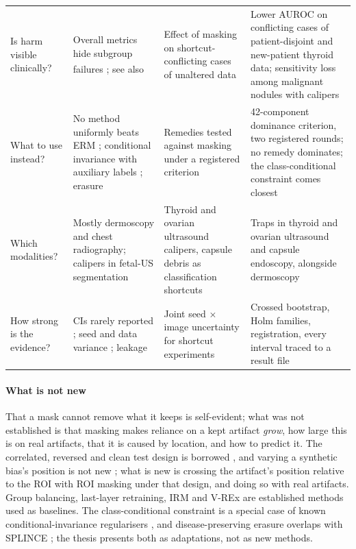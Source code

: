 \documentclass[11pt,a4paper]{article}
\newcommand{\bg}{\textsuperscript{\dag}}
\begin{document}
\begin{longtable}{P{2.2cm}P{4.5cm}P{3.8cm}P{4.5cm}}
Is harm visible clinically? & Overall metrics hide subgroup failures \citep{yang2024limits}; see also \citet{oakden2020hidden}\bg & Effect of masking on shortcut-conflicting cases of unaltered data & Lower AUROC on conflicting cases of patient-disjoint and new-patient thyroid data; sensitivity loss among malignant nodules with calipers \\
What to use instead? & No method uniformly beats ERM \citep{yang2023change,zong2023medfair}; conditional invariance with auxiliary labels \citep{veitch2021counterfactual,makar2022causally}; erasure \citep{belrose2023leace,holstege2025splince} & Remedies tested against masking under a registered criterion & 42-component dominance criterion, two registered rounds; no remedy dominates; the class-conditional constraint comes closest \\
Which modalities? & Mostly dermoscopy and chest radiography; calipers in fetal-US segmentation \citep{lin2024segshortcut} & Thyroid and ovarian ultrasound calipers, capsule debris as classification shortcuts & Traps in thyroid and ovarian ultrasound and capsule endoscopy, alongside dermoscopy \\
How strong is the evidence? & CIs rarely reported \citep{christodoulou2024ci}; seed and data variance \citep{bouthillier2021variance}; leakage \citep{kapoor2023leakage} & Joint seed $\times$ image uncertainty for shortcut experiments & Crossed bootstrap, Holm families, registration, every interval traced to a result file \\
\end{longtable}

\paragraph{What is not new} That a mask cannot remove what it keeps is self-evident; what was not established is that
masking makes reliance on a kept artifact \emph{grow}, how large this is on real artifacts, that it is caused by
location, and how to predict it. The correlated, reversed and clean test design is borrowed
\citep{arjovsky2019irm,puli2022nurd,bassi2024isnet,corbetta2026beyond}, and varying a synthetic bias's position is
not new \citep{stanley2024simba,boland2024shortcuts}; what is new is crossing the artifact's position relative to the
ROI with ROI masking under that design, and doing so with real artifacts. Group balancing, last-layer retraining, IRM and V-REx are established methods used as
baselines. The class-conditional constraint is a special case of known conditional-invariance regularisers
\citep{veitch2021counterfactual,makar2022causally}, and disease-preserving erasure overlaps with SPLINCE
\citep{holstege2025splince}; the thesis presents both as adaptations, not as new methods.
\end{document}

